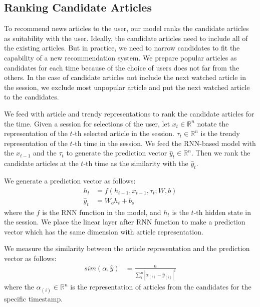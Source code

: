 \subsection{Ranking Candidate Articles}
\label{sec:method:ranking}
To recommend news articles to the user, our model ranks the candidate articles as suitability with the user.
Ideally, the candidate articles need to include all of the existing articles.
But in practice, we need to narrow candidates to fit the capability of a new recommendation system.
We prepare popular articles as candidates for each time because of the choice of users does not far from the others.
In the case of candidate articles not include the next watched article in the session, we exclude most unpopular article and put the next watched article to the candidates.

We feed \method with article and trendy representations to rank the candidate articles for the time.
Given a session for selections of the user, let $x_t \in \mathbb{R}^{n}$ notate the representation of the $t$-th selected article in the session.
$\tau_t \in \mathbb{R}^{n}$ is the trendy representation of the $t$-th time in the session.
We feed the RNN-based model with the $x_{t-1}$ and the $\tau_t$ to generate the prediction vector $\hat{y}_t \in \mathbb{R}^{n}$.
Then we rank the candidate articles at the $t$-th time as the similarity with the $\hat{y}_t$.

We generate a prediction vector as follows:
\begin{align*}
	h_t &= f(h_{t-1}, x_{t-1}, \tau_t;W,b) \\
	\hat{y}_t &= W_oh_t + b_o
\end{align*}
where the $f$ is the RNN function in the model, and $h_t$ is the $t$-th hidden state in the session.
We place the linear layer after RNN function to make a prediction vector which has the same dimension with article representation.

We measure the similarity between the article representation and the prediction vector as follows:
\begin{align*}
	sim(\alpha, \hat{y}) &= \frac{n}{\sum_{i}^{n}{{|\alpha_{(i)}-\hat{y}_{(i)}|}^2}}
\end{align*}
where the $\alpha_{(i)} \in \mathbb{R}^{n}$ is the representation of articles from the candidates for the specific timestamp.

